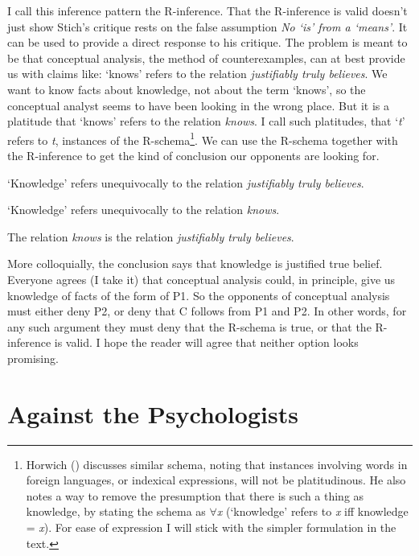 \documentclass[
  10pt,
  letterpaper,
  DIV=11,
  numbers=noendperiod,
  twoside]{scrartcl}
\providecommand{\tightlist}{%
  \setlength{\itemsep}{0pt}\setlength{\parskip}{0pt}}\usepackage{longtable,booktabs,array}
\begin{document}
I call this inference pattern the R-inference. That the R-inference is
valid doesn't just show Stich's critique rests on the false assumption
\emph{No `is' from a `means'}. It can be used to provide a direct
response to his critique. The problem is meant to be that conceptual
analysis, the method of counterexamples, can at best provide us with
claims like: `knows' refers to the relation \emph{justifiably truly
believes}. We want to know facts about knowledge, not about the term
`knows', so the conceptual analyst seems to have been looking in the
wrong place. But it is a platitude that `knows' refers to the relation
\emph{knows}. I call such platitudes, that `\emph{t}' refers to
\emph{t}, instances of the R-schema\footnote{Horwich
  () discusses similar schema,
  noting that instances involving words in foreign languages, or
  indexical expressions, will not be platitudinous. He also notes a way
  to remove the presumption that there is such a thing as knowledge, by
  stating the schema as \({\forall}\)\emph{x} (`knowledge' refers to
  \emph{x} iff knowledge = \emph{x}). For ease of expression I will
  stick with the simpler formulation in the text.}. We can use the
R-schema together with the R-inference to get the kind of conclusion our
opponents are looking for.

\begin{description}
\tightlist
\item[P1.]
`Knowledge' refers unequivocally to the relation \emph{justifiably truly
believes}.
\item[P2.]
`Knowledge' refers unequivocally to the relation \emph{knows}.
\item[C.]
The relation \emph{knows} is the relation \emph{justifiably truly
believes}.
\end{description}

More colloquially, the conclusion says that knowledge is justified true
belief. Everyone agrees (I take it) that conceptual analysis could, in
principle, give us knowledge of facts of the form of P1. So the
opponents of conceptual analysis must either deny P2, or deny that C
follows from P1 and P2. In other words, for any such argument they must
deny that the R-schema is true, or that the R-inference is valid. I hope
the reader will agree that neither option looks promising.

\section{Against the Psychologists}\label{against-the-psychologists}
\end{document}
